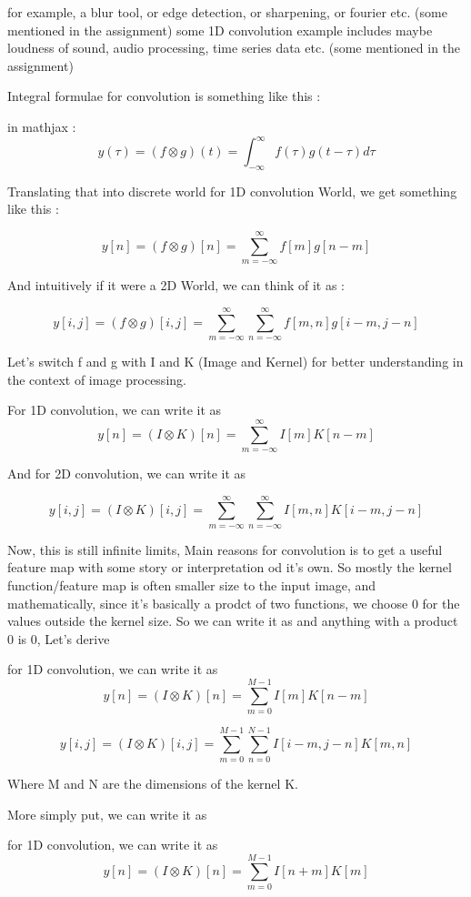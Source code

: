 \documentclass[
]{article}
\begin{document}
for example, a blur tool, or edge detection, or sharpening, or fourier
etc. (some mentioned in the assignment) some 1D convolution example
includes maybe loudness of sound, audio processing, time series data
etc. (some mentioned in the assignment)

Integral formulae for convolution is something like this :

in mathjax :
\[y(\tau) = (f \otimes g)(t) = \int_{-\infty}^{\infty} f(\tau) g(t - \tau) d \tau\]

Translating that into discrete world for 1D convolution World, we get
something like this :

\[y[n] = (f \otimes g)[n] = \sum_{m=-\infty}^{\infty} f[m] g[n - m]\]

And intuitively if it were a 2D World, we can think of it as :

\[y[i, j] = (f \otimes g)[i, j] = \sum_{m=-\infty}^{\infty} \sum_{n=-\infty}^{\infty} f[m, n] g[i - m, j - n]\]

Let's switch f and g with I and K (Image and Kernel) for better
understanding in the context of image processing.

For 1D convolution, we can write it as
\[y[n] = (I \otimes K)[n] = \sum_{m=-\infty}^{\infty} I[m] K[n - m]\]

And for 2D convolution, we can write it as

\[y[i, j] = (I \otimes K)[i, j] = \sum_{m=-\infty}^{\infty} \sum_{n=-\infty}^{\infty} I[m, n] K[i - m, j - n]\]

Now, this is still infinite limits, Main reasons for convolution is to
get a useful feature map with some story or interpretation od it's own.
So mostly the kernel function/feature map is often smaller size to the
input image, and mathematically, since it's basically a prodct of two
functions, we choose 0 for the values outside the kernel size. So we can
write it as and anything with a product 0 is 0, Let's derive

for 1D convolution, we can write it as
\[y[n] = (I \otimes K)[n] = \sum_{m=0}^{M-1} I[m] K[n - m]\]

\[y[i, j] = (I \otimes K)[i, j] = \sum_{m=0}^{M-1} \sum_{n=0}^{N-1} I[i - m, j - n] K[m, n]\]

Where M and N are the dimensions of the kernel K.

More simply put, we can write it as

for 1D convolution, we can write it as
\[y[n] = (I \otimes K)[n] = \sum_{m=0}^{M-1} I[n + m] K[m]\]
\end{document}
